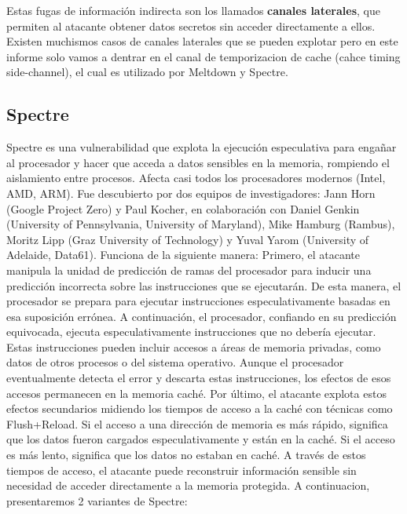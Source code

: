 \documentclass[lettersize,compsoc]{IEEEtran}
\begin{document}
Estas fugas de información indirecta son los llamados \textbf{canales laterales}, que permiten al atacante obtener datos secretos sin acceder directamente a ellos. \newline
Existen muchismos casos de canales laterales que se pueden explotar pero en este informe solo vamos a dentrar en el canal de temporizacion de cache (cahce timing side-channel), el cual es utilizado por Meltdown y Spectre.
\subsection{Spectre}
Spectre es una vulnerabilidad que explota la ejecución especulativa para engañar al procesador y hacer que acceda a datos sensibles en la memoria, rompiendo el aislamiento entre procesos.
\newline Afecta casi todos los procesadores modernos (Intel, AMD, ARM).
\newline Fue descubierto por dos equipos de investigadores: Jann Horn (Google Project Zero) y Paul Kocher, en colaboración con Daniel Genkin (University of Pennsylvania, University of Maryland), Mike Hamburg (Rambus), Moritz Lipp (Graz University of Technology) y Yuval Yarom (University of Adelaide, Data61).
\newline Funciona de la siguiente manera:
Primero, el atacante manipula la unidad de predicción de ramas del procesador para inducir una predicción incorrecta sobre las instrucciones que se ejecutarán. De esta manera, el procesador se prepara para ejecutar instrucciones especulativamente basadas en esa suposición errónea.
A continuación, el procesador, confiando en su predicción equivocada, ejecuta especulativamente instrucciones que no debería ejecutar. Estas instrucciones pueden incluir accesos a áreas de memoria privadas, como datos de otros procesos o del sistema operativo. Aunque el procesador eventualmente detecta el error y descarta estas instrucciones, los efectos de esos accesos permanecen en la memoria caché.
Por último, el atacante explota estos efectos secundarios midiendo los tiempos de acceso a la caché con técnicas como Flush+Reload. Si el acceso a una dirección de memoria es más rápido, significa que los datos fueron cargados especulativamente y están en la caché. Si el acceso es más lento, significa que los datos no estaban en caché. A través de estos tiempos de acceso, el atacante puede reconstruir información sensible sin necesidad de acceder directamente a la memoria protegida.
\newline A continuacion, presentaremos 2 variantes de Spectre:
\end{document}

